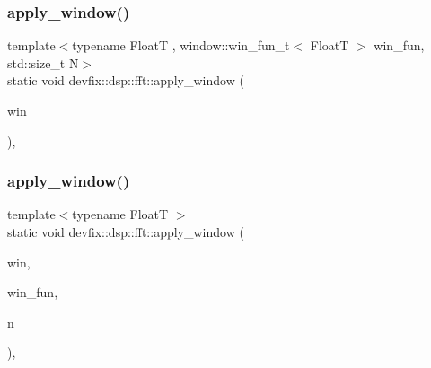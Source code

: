 \subsubsection{\texorpdfstring{apply\+\_\+window()}{apply\_window()}\hspace{0.1cm}{\footnotesize\ttfamily [3/6]}}
{\footnotesize\ttfamily template$<$typename FloatT , window\+::win\+\_\+fun\+\_\+t$<$ Float\+T $>$ win\+\_\+fun, std\+::size\+\_\+t N$>$ \\
static void devfix\+::dsp\+::fft\+::apply\+\_\+window (\begin{DoxyParamCaption}\item[{std\+::array$<$ std\+::complex$<$ FloatT $>$, N $>$ \&}]{win }\end{DoxyParamCaption})\hspace{0.3cm}{\ttfamily [inline]}, {\ttfamily [static]}}

\mbox{\label{structdevfix_1_1dsp_1_1fft_a715dd18ec8a7c196a2b1879c072b7094}} 
\subsubsection{\texorpdfstring{apply\+\_\+window()}{apply\_window()}\hspace{0.1cm}{\footnotesize\ttfamily [4/6]}}
{\footnotesize\ttfamily template$<$typename FloatT $>$ \\
static void devfix\+::dsp\+::fft\+::apply\+\_\+window (\begin{DoxyParamCaption}\item[{std\+::complex$<$ FloatT $>$ $\ast$}]{win,  }\item[{\hyperlink{structdevfix_1_1dsp_1_1window_ab2d2c0c5f5fca6dbcf91895115b69eac}{window\+::win\+\_\+fun\+\_\+t}$<$ FloatT $>$}]{win\+\_\+fun,  }\item[{std\+::size\+\_\+t}]{n }\end{DoxyParamCaption})\hspace{0.3cm}{\ttfamily [inline]}, {\ttfamily [static]}}

\mbox{\label{structdevfix_1_1dsp_1_1fft_aeb8a3b7c0b4f290877225c25822e2225}} 
